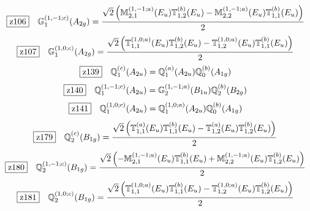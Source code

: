 \documentclass[fleqn,10pt,landscape]{jsarticle}
\begin{document}
\begin{dmath*}
\hspace*{3mm}\fbox{z106}\quad \mathbb{G}_{1}^{(1,-1;c)}(A_{2g})=\frac{\sqrt{2} \left(\mathbb{M}_{2,1}^{(1,-1;a)}(E_{u}) \mathbb{T}_{1,2}^{(b)}(E_{u}) - \mathbb{M}_{2,2}^{(1,-1;a)}(E_{u}) \mathbb{T}_{1,1}^{(b)}(E_{u})\right)}{2}
\end{dmath*}
\begin{dmath*}
\hspace*{3mm}\fbox{z107}\quad \mathbb{G}_{1}^{(1,0;c)}(A_{2g})=\frac{\sqrt{2} \left(\mathbb{T}_{1,1}^{(1,0;a)}(E_{u}) \mathbb{T}_{1,2}^{(b)}(E_{u}) - \mathbb{T}_{1,2}^{(1,0;a)}(E_{u}) \mathbb{T}_{1,1}^{(b)}(E_{u})\right)}{2}
\end{dmath*}
\begin{dmath*}
\hspace*{3mm}\fbox{z139}\quad \mathbb{Q}_{1}^{(c)}(A_{2u})=\mathbb{Q}_{1}^{(a)}(A_{2u}) \mathbb{Q}_{0}^{(b)}(A_{1g})
\end{dmath*}
\begin{dmath*}
\hspace*{3mm}\fbox{z140}\quad \mathbb{Q}_{1}^{(1,-1;c)}(A_{2u})=\mathbb{G}_{2}^{(1,-1;a)}(B_{1u}) \mathbb{Q}_{2}^{(b)}(B_{2g})
\end{dmath*}
\begin{dmath*}
\hspace*{3mm}\fbox{z141}\quad \mathbb{Q}_{1}^{(1,0;c)}(A_{2u})=\mathbb{Q}_{1}^{(1,0;a)}(A_{2u}) \mathbb{Q}_{0}^{(b)}(A_{1g})
\end{dmath*}
\begin{dmath*}
\hspace*{3mm}\fbox{z179}\quad \mathbb{Q}_{2}^{(c)}(B_{1g})=\frac{\sqrt{2} \left(\mathbb{T}_{1,1}^{(a)}(E_{u}) \mathbb{T}_{1,1}^{(b)}(E_{u}) - \mathbb{T}_{1,2}^{(a)}(E_{u}) \mathbb{T}_{1,2}^{(b)}(E_{u})\right)}{2}
\end{dmath*}
\begin{dmath*}
\hspace*{3mm}\fbox{z180}\quad \mathbb{Q}_{2}^{(1,-1;c)}(B_{1g})=\frac{\sqrt{2} \left(- \mathbb{M}_{2,1}^{(1,-1;a)}(E_{u}) \mathbb{T}_{1,1}^{(b)}(E_{u}) + \mathbb{M}_{2,2}^{(1,-1;a)}(E_{u}) \mathbb{T}_{1,2}^{(b)}(E_{u})\right)}{2}
\end{dmath*}
\begin{dmath*}
\hspace*{3mm}\fbox{z181}\quad \mathbb{Q}_{2}^{(1,0;c)}(B_{1g})=\frac{\sqrt{2} \left(\mathbb{T}_{1,1}^{(1,0;a)}(E_{u}) \mathbb{T}_{1,1}^{(b)}(E_{u}) - \mathbb{T}_{1,2}^{(1,0;a)}(E_{u}) \mathbb{T}_{1,2}^{(b)}(E_{u})\right)}{2}
\end{dmath*}
\end{document}
